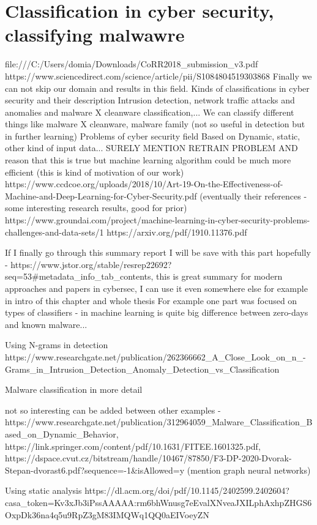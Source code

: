 \section{Classification in cyber security, classifying malwawre}
file:///C:/Users/domia/Downloads/CoRR2018_submission_v3.pdf
https://www.sciencedirect.com/science/article/pii/S1084804519303868
Finally we can not skip our domain and results in this field. 
Kinds of classifications in cyber security and their description
Intrusion detection, network traffic attacks and anomalies and malware X cleanware classification,...
We can classify different things like malware X cleanware, malware family (not so useful in detection but in further learning)
Problems of cyber security field
Based on Dynamic, static, other kind of input data...
SURELY MENTION RETRAIN PROBLEM AND reason that this is true but machine learning algorithm could be much more efficient (this is kind of motivation of our work)
https://www.ccdcoe.org/uploads/2018/10/Art-19-On-the-Effectiveness-of-Machine-and-Deep-Learning-for-Cyber-Security.pdf (eventually their references - some interesting research results, good for prior)
https://www.groundai.com/project/machine-learning-in-cyber-security-problems-challenges-and-data-sets/1
https://arxiv.org/pdf/1910.11376.pdf

If I finally go through this summary report I will be save with this part hopefully - https://www.jstor.org/stable/resrep22692?seq=53#metadata_info_tab_contents, this is great summary for modern approaches and papers in cybersec, I can use it even somewhere else for example in intro of this chapter and whole thesis
For example one part was focused on types of classifiers - in machine learning is quite big difference between zero-days and known malware...

Using N-grams in detection https://www.researchgate.net/publication/262366662_A_Close_Look_on_n_-Grams_in_Intrusion_Detection_Anomaly_Detection_vs_Classification

Malware classification in more detail

not so interesting can be added between other examples - https://www.researchgate.net/publication/312964059_Malware_Classification_Based_on_Dynamic_Behavior, https://link.springer.com/content/pdf/10.1631/FITEE.1601325.pdf, https://dspace.cvut.cz/bitstream/handle/10467/87850/F3-DP-2020-Dvorak-Stepan-dvorast6.pdf?sequence=-1&isAllowed=y (mention graph neural networks)

Using static analysis https://dl.acm.org/doi/pdf/10.1145/2402599.2402604?casa_token=Kv3xJb3iPssAAAAA:rm6bhWnusg7eEvalXNveaJXILphAxhpZHGS6OxpDk36na4q5u9RpZ3gM83IMQWq1QQ0aEIVoeyZN

